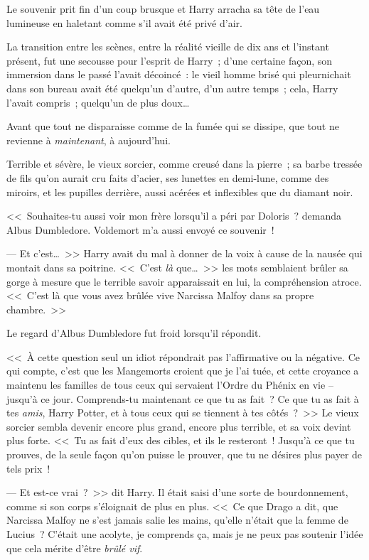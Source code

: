 \later

Le souvenir prit fin d'un coup brusque et Harry arracha sa tête de l'eau lumineuse en haletant comme s'il avait été privé d'air.

La transition entre les scènes, entre la réalité vieille de dix ans et l'instant présent, fut une secousse pour l'esprit de Harry~; d'une certaine façon, son immersion dans le passé l'avait décoincé~: le vieil homme brisé qui pleurnichait dans son bureau avait été quelqu'un d'autre, d'un autre temps~; cela, Harry l'avait compris~; quelqu'un de plus doux…

Avant que tout ne disparaisse comme de la fumée qui se dissipe, que tout ne revienne à \emph{maintenant}, à aujourd'hui.

Terrible et sévère, le vieux sorcier, comme creusé dans la pierre~; sa barbe tressée de fils qu'on aurait cru faits d'acier, ses lunettes en demi-lune, comme des miroirs, et les pupilles derrière, aussi acérées et inflexibles que du diamant noir.

<<~Souhaites-tu aussi voir mon frère lorsqu'il a péri par Doloris~? demanda Albus Dumbledore. Voldemort m'a aussi envoyé ce souvenir~!

--- Et c'est…~>> Harry avait du mal à donner de la voix à cause de la nausée qui montait dans sa poitrine. <<~C'est \emph{là} que…~>> les mots semblaient brûler sa gorge à mesure que le terrible savoir apparaissait en lui, la compréhension atroce. <<~C'est là que vous avez brûlée vive Narcissa Malfoy dans sa propre chambre.~>>

Le regard d'Albus Dumbledore fut froid lorsqu'il répondit.

<<~À cette question seul un idiot répondrait pas l'affirmative ou la négative. Ce qui compte, c'est que les Mangemorts croient que je l'ai tuée, et cette croyance a maintenu les familles de tous ceux qui servaient l'Ordre du Phénix en vie -- jusqu'à ce jour. Comprends-tu maintenant ce que tu as fait~? Ce que tu as fait à tes \emph{amis}, Harry Potter, et à tous ceux qui se tiennent à tes côtés~?~>> Le vieux sorcier sembla devenir encore plus grand, encore plus terrible, et sa voix devint plus forte. <<~Tu as fait d'eux des cibles, et ils le resteront~! Jusqu'à ce que tu prouves, de la seule façon qu'on puisse le prouver, que tu ne désires plus payer de tels prix~!

--- Et est-ce vrai~?~>> dit Harry. Il était saisi d'une sorte de bourdonnement, comme si son corps s'éloignait de plus en plus. <<~Ce que Drago a dit, que Narcissa Malfoy ne s'est jamais salie les mains, qu'elle n'était que la femme de Lucius~? C'était une acolyte, je comprends ça, mais je ne peux pas soutenir l'idée que cela mérite d'être \emph{brûlé vif}.

